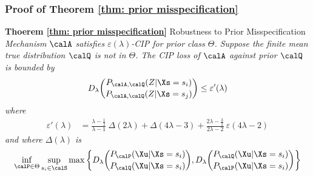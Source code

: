 \subsubsection{Proof of Theorem \ref{thm: prior misspecification}}
\label{apx: prior misspecification proof}
\textbf{Thoerem \ref{thm: prior misspecification}}
Robustness to Prior Misspecification 
\textit{
	Mechanism $\calA$ satisfies $\varepsilon(\lambda)$-CIP for prior class $\Theta$. Suppose the finite mean true distribution $\calQ$ is not in $\Theta$. The CIP loss of $\calA$ against prior $\calQ$ is bounded by 
	\begin{align*}
		D_\lambda \binom{P_{\calA, \calQ}(Z | \Xs = s_i)}{P_{\calA, \calQ}(Z | \Xs = s_j)} \leq \varepsilon'(\lambda)
	\end{align*}
	where
	\begin{align*}
		\varepsilon'(\lambda) 
		&= \frac{\lambda - \frac{1}{2}}{\lambda - 1} \ \Delta(2\lambda) + 
		\Delta(4\lambda - 3) +
		\frac{2\lambda - \frac{3}{2}}{2\lambda - 2} \ \varepsilon(4 \lambda -2)
	\end{align*}
	and where $\Delta(\lambda)$ is
	\begin{align*}
		\inf_{\calP \in \Theta} \sup_{s_i \in \calS} \max \bigg\{ 
		D_\lambda \binom{P_{ \calP}(\Xu | \Xs = s_i)}{P_{ \calQ}(\Xu | \Xs = s_i)}, 
		D_\lambda \binom{P_{ \calQ}(\Xu | \Xs = s_i)}{P_{ \calP}(\Xu | \Xs = s_i)}
		\bigg\}
	\end{align*}
}
